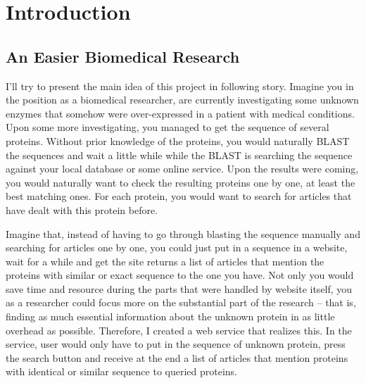 
\chapter{Introduction} %

\label{Chapter1} %



\section{An Easier Biomedical Research}

I'll try to present the main idea of this project in following story. Imagine you in the position as a biomedical researcher, are currently investigating some unknown enzymes that somehow were over-expressed in a patient with medical conditions. Upon some more investigating, you managed to get the sequence of several proteins. Without prior knowledge of the proteins, you would naturally BLAST the sequences and wait a little while while the BLAST is searching the sequence against your local database or some online service. Upon the results were coming, you would naturally want to check the resulting proteins one by one, at least the best matching ones. For each protein, you would want to search for articles that have dealt with this protein before.

Imagine that, instead of having to go through blasting the sequence manually and searching for articles one by one, you could just put in a sequence in a website, wait for a while and get the site returns a list of articles that mention the proteins with similar or exact sequence to the one you have. Not only you would save time and resource during the parts that were handled by website itself, you as a researcher could focus more on the substantial part of the research -- that is, finding as much essential information about the unknown protein in as little overhead as possible. Therefore, I created a web service that realizes this. In the service, user would only have to put in the sequence of unknown protein, press the search button and receive at the end a list of articles that mention proteins with identical or similar sequence to queried proteins.

